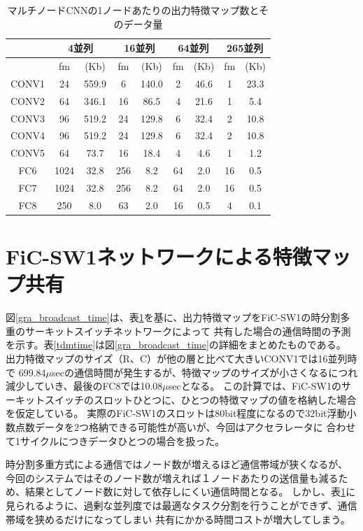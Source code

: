 \begin{table}[ht]
 \begin{center}
  \caption{マルチノードCNNの1ノードあたりの出力特徴マップ数とそのデータ量}
   \begin{tabular}{|c|c|c|c|c|c|c|c|c|} \hline
    　& \multicolumn{2}{|c|}{4並列} & \multicolumn{2}{c|}{16並列} & \multicolumn{2}{c|}{64並列} & \multicolumn{2}{c|}{265並列}\\ \hline
    　& fm & (Kb) & fm & (Kb) & fm & (Kb) & fm & (Kb) \\ \hline
     CONV1 & 24 & 559.9 & 6 & 140.0 & 2 & 46.6 & 1 & 23.3 \\
     CONV2 & 64 & 346.1 & 16 & 86.5 & 4 & 21.6 & 1 & 5.4 \\
     CONV3 & 96 & 519.2 & 24 & 129.8 & 6 & 32.4 & 2 & 10.8 \\
     CONV4 & 96 & 519.2 & 24 & 129.8 & 6 & 32.4 & 2 & 10.8 \\
     CONV5 & 64 & 73.7 & 16 & 18.4 & 4 & 4.6 & 1 & 1.2 \\
     FC6 & 1024 & 32.8 & 256 & 8.2 & 64 & 2.0 & 16 & 0.5 \\
     FC7 & 1024 & 32.8 & 256 & 8.2 & 64 & 2.0 & 16 & 0.5 \\
     FC8 & 250 & 8.0 & 63 & 2.0 & 16 & 0.5 & 4 & 0.1 \\ \hline
  \end{tabular}
  \label{node}  
 \end{center}
\end{table}

\section{FiC-SW1ネットワークによる特徴マップ共有}
図\ref{gra_broadcast_time}は、表\ref{node}を基に、出力特徴マップをFiC-SW1の時分割多重のサーキットスイッチネットワークによって
共有した場合の通信時間の予測を示す。表\ref{tdmtime}は図\ref{gra_broadcast_time}の詳細をまとめたものである。
出力特徴マップのサイズ（R、C）が他の層と比べて大きいCONV1では16並列時で
699.84$\mu$secの通信時間が発生するが、特徴マップのサイズが小さくなるにつれ減少していき、最後のFC8では10.08$\mu$secとなる。
この計算では、FiC-SW1のサーキットスイッチのスロットひとつに、ひとつの特徴マップの値を格納した場合を仮定している。
実際のFiC-SW1のスロットは80bit程度になるので32bit浮動小数点数データを2つ格納できる可能性が高いが、今回はアクセラレータに
合わせて1サイクルにつきデータひとつの場合を扱った。

時分割多重方式による通信ではノード数が増えるほど通信帯域が狭くなるが、
今回のシステムではそのノード数が増えれば１ノードあたりの送信量も減るため、結果としてノード数に対して依存しにくい通信時間となる。
しかし、表\ref{node}に見られるように、過剰な並列度では最適なタスク分割を行うことができず、通信帯域を狭めるだけになってしまい
共有にかかる時間コストが増大してしまう。

